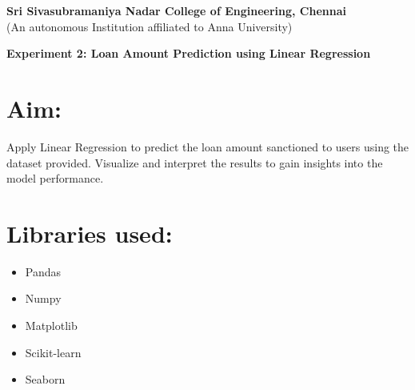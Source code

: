 \documentclass[11pt]{article}
\begin{document}
\begin{center}
    \large \textbf{Sri Sivasubramaniya Nadar College of Engineering, Chennai} \\
    (An autonomous Institution affiliated to Anna University) \\
    \vspace{0.3cm}
\end{center}

\begin{table}[!h]
\renewcommand{\arraystretch}{1.5}
\end{table}

\vspace{0.5cm}

\begin{center}
 \textbf{Experiment 2: Loan Amount Prediction using Linear Regression}
\end{center}

\noindent
\section{Aim:} 
Apply Linear Regression to predict the loan amount sanctioned to users using the dataset provided.
 Visualize and interpret the results to gain insights into the model performance.

\vspace{0.4cm}
\noindent
\section{Libraries used:}
\begin{itemize}
    \item {Pandas}
    \item {Numpy}
    \item {Matplotlib}
    \item {Scikit-learn}
    \item {Seaborn}
\end{itemize}
\end{document}
